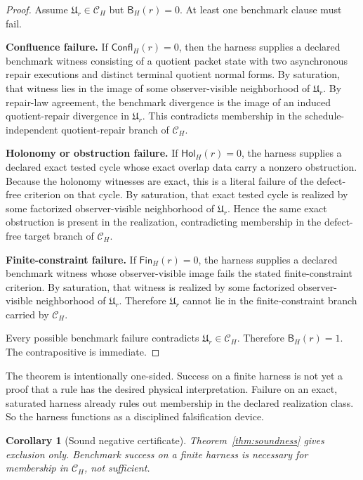 \documentclass[11pt]{article}
\newtheorem{corollary}[theorem]{Corollary}
\theoremstyle{remark}
\theoremstyle{plain}
\begin{document}
\begin{proof}
Assume \(\mathfrak U_r\in\mathcal C_H\) but \(\mathsf B_H(r)=0\). At least one benchmark clause must fail.

\smallskip
\noindent
\textbf{Confluence failure.}
If \(\mathsf{Confl}_H(r)=0\), then the harness supplies a declared benchmark witness consisting of a quotient packet state with two asynchronous repair executions and distinct terminal quotient normal forms. By saturation, that witness lies in the image of some observer-visible neighborhood of \(\mathfrak U_r\). By repair-law agreement, the benchmark divergence is the image of an induced quotient-repair divergence in \(\mathfrak U_r\). This contradicts membership in the schedule-independent quotient-repair branch of \(\mathcal C_H\).

\smallskip
\noindent
\textbf{Holonomy or obstruction failure.}
If \(\mathsf{Hol}_H(r)=0\), the harness supplies a declared exact tested cycle whose exact overlap data carry a nonzero obstruction. Because the holonomy witnesses are exact, this is a literal failure of the defect-free criterion on that cycle. By saturation, that exact tested cycle is realized by some factorized observer-visible neighborhood of \(\mathfrak U_r\). Hence the same exact obstruction is present in the realization, contradicting membership in the defect-free target branch of \(\mathcal C_H\).

\smallskip
\noindent
\textbf{Finite-constraint failure.}
If \(\mathsf{Fin}_H(r)=0\), the harness supplies a declared benchmark witness whose observer-visible image fails the stated finite-constraint criterion. By saturation, that witness is realized by some factorized observer-visible neighborhood of \(\mathfrak U_r\). Therefore \(\mathfrak U_r\) cannot lie in the finite-constraint branch carried by \(\mathcal C_H\).

\smallskip
Every possible benchmark failure contradicts \(\mathfrak U_r\in\mathcal C_H\). Therefore \(\mathsf B_H(r)=1\). The contrapositive is immediate.
\end{proof}

The theorem is intentionally one-sided. Success on a finite harness is not yet a proof that a rule has the desired physical interpretation. Failure on an exact, saturated harness already rules out membership in the declared realization class. So the harness functions as a disciplined falsification device.

\begin{corollary}[Sound negative certificate]
\label{cor:negative}
Theorem~\ref{thm:soundness} gives exclusion only. Benchmark success on a finite harness is necessary for membership in \(\mathcal C_H\), not sufficient.
\end{corollary}
\end{document}
